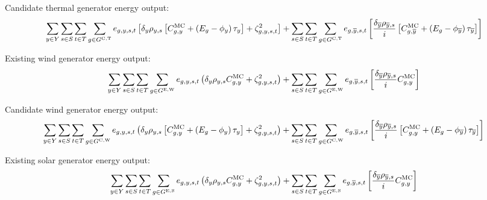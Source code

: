\documentclass{article}
\newcommand{\sGeneratorsExistingWind}{G^{\mathrm{E,W}}}
\newcommand{\sGeneratorsExistingSolar}{G^{\mathrm{E,S}}}
\newcommand{\sGeneratorsCandidateThermal}{G^{\mathrm{C,T}}}
\newcommand{\sGeneratorsCandidateWind}{G^{\mathrm{C,W}}}
\newcommand{\sScenarios}{S}
\newcommand{\sIntervals}{T}
\newcommand{\iGenerator}{g}
\newcommand{\iYear}{y}
\newcommand{\iYearTerminal}{\overline{\iYear}}
\newcommand{\iScenario}{s}
\newcommand{\iInterval}{t}
\newcommand{\cScenarioDuration}[1][\iYear,\iScenario]{\rho_{#1}}
\newcommand{\cMarginalCost}[1][\iGenerator,\iYear]{C^{\mathrm{MC}}_{#1}}
\newcommand{\cEmissionsIntensity}[1][\iGenerator]{E_{#1}}
\newcommand{\cInterestRate}{i}
\newcommand{\cDiscountRate}[1][\iYear]{\delta_{#1}}
\newcommand{\vBaseline}[1][\iYear]{\phi_{#1}}
\newcommand{\vPermitPrice}[1][\iYear]{\tau_{#1}}
\newcommand{\vEnergy}[1][\iGenerator,\iYear,\iScenario,\iInterval]{e_{#1}}
\newcommand{\dGeneratorEnergyOutput}[1][\iGenerator,\iYear,\iScenario,\iInterval]{\zeta_{#1}^{2}}
\begin{document}
Candidate thermal generator energy output:
\begin{equation}
	\sumIntervals \sum\limits_{\iGenerator \in \sGeneratorsCandidateThermal} \vEnergy \left[\cDiscountRate \cScenarioDuration \left[\cMarginalCost + \left(\cEmissionsIntensity - \vBaseline\right)\vPermitPrice \right]  + \dGeneratorEnergyOutput\right] + \sum\limits_{\iScenario \in \sScenarios} \sum\limits_{\iInterval \in \sIntervals} \sum\limits_{\iGenerator \in \sGeneratorsCandidateThermal} \vEnergy[\iGenerator,\iYearTerminal,\iScenario,\iInterval] \left[ \frac{\cDiscountRate[\iYearTerminal] \cScenarioDuration[\iYearTerminal,\iScenario]}{\cInterestRate} \left[\cMarginalCost[\iGenerator,\iYearTerminal] + \left(\cEmissionsIntensity - \vBaseline[\iYearTerminal]\right)\vPermitPrice[\iYearTerminal] \right]\right]
\end{equation}

Existing wind generator energy output:
\begin{equation}
	\sumIntervals \sum\limits_{\iGenerator \in \sGeneratorsExistingWind} \vEnergy \left(\cDiscountRate\cScenarioDuration \cMarginalCost + \dGeneratorEnergyOutput \right) + \sum\limits_{\iScenario \in \sScenarios} \sum\limits_{\iInterval \in \sIntervals} \sum\limits_{\iGenerator \in \sGeneratorsExistingWind} \vEnergy[\iGenerator,\iYearTerminal,\iScenario,\iInterval] \left[ \frac{\cDiscountRate[\iYearTerminal] \cScenarioDuration[\iYearTerminal,\iScenario]}{\cInterestRate} \cMarginalCost \right]
\end{equation}

Candidate wind generator energy output:
\begin{equation}
	\sumIntervals \sum\limits_{\iGenerator \in \sGeneratorsCandidateWind} \vEnergy \left(\cDiscountRate\cScenarioDuration \left[\cMarginalCost + \left(\cEmissionsIntensity - \vBaseline\right)\vPermitPrice \right] + \dGeneratorEnergyOutput \right) + \sum\limits_{\iScenario \in \sScenarios} \sum\limits_{\iInterval \in \sIntervals} \sum\limits_{\iGenerator \in \sGeneratorsCandidateWind} \vEnergy[\iGenerator,\iYearTerminal,\iScenario,\iInterval] \left[ \frac{\cDiscountRate[\iYearTerminal] \cScenarioDuration[\iYearTerminal,\iScenario]}{\cInterestRate} \left[\cMarginalCost + \left(\cEmissionsIntensity - \vBaseline[\iYearTerminal] \right)\vPermitPrice[\iYearTerminal] \right] \right]
\end{equation}

Existing solar generator energy output:
\begin{equation}
	\sumIntervals \sum\limits_{\iGenerator \in \sGeneratorsExistingSolar} \vEnergy \left(\cDiscountRate\cScenarioDuration \cMarginalCost + \dGeneratorEnergyOutput \right) + \sum\limits_{\iScenario \in \sScenarios} \sum\limits_{\iInterval \in \sIntervals} \sum\limits_{\iGenerator \in \sGeneratorsExistingSolar} \vEnergy[\iGenerator,\iYearTerminal,\iScenario,\iInterval] \left[ \frac{\cDiscountRate[\iYearTerminal] \cScenarioDuration[\iYearTerminal,\iScenario]}{\cInterestRate} \cMarginalCost \right]
\end{equation}
\end{document}
